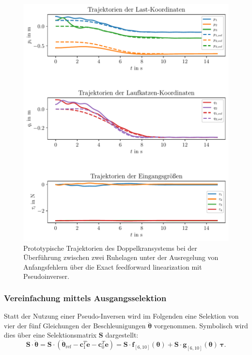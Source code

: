 \begin{figure}[H]
	\begin{center}
		\includegraphics[scale=1]{Pictures/feedforward_lin_pseudo_controller_initial_error}
	\end{center}
	\caption[Trajektorien Ruhelagenüberführung mit Regelung über Exact feedforward linearization (Pseudoinverse)]
	{Prototypische Trajektorien des Doppelkransystems bei der Überführung zwischen zwei Ruhelagen unter der Ausregelung von Anfangsfehlern über die Exact feedforward linearization mit Pseudoinverser.}
	\label{fig_feedforward_pseudo_controller_initial_error}
\end{figure}

\subsubsection{Vereinfachung mittels Ausgangsselektion}
Statt der Nutzung einer Pseudo-Inversen wird im Folgenden eine Selektion von vier der fünf Gleichungen der Beschleunigungen $\ddot{\boldsymbol{\theta}}$ vorgenommen. Symbolisch wird dies über eine Selektionsmatrix $\mathbf{S}$ dargestellt:
\begin{equation}
	\mathbf{S} \cdot \ddot{\boldsymbol{\theta}} = \mathbf{S} \cdot (\ddot{\boldsymbol{\theta}}_{\text{ref}} - \mathbf{c}_1^T \dot{\mathbf{e}} - \mathbf{c}_0^T \mathbf{e}) = \mathbf{S} \cdot \mathbf{f}_{[6, 10]}(\boldsymbol{\theta}) + \mathbf{S} \cdot \mathbf{g}_{[6, 10]}(\boldsymbol{\theta}) \ \boldsymbol{\tau}.
\end{equation} 

